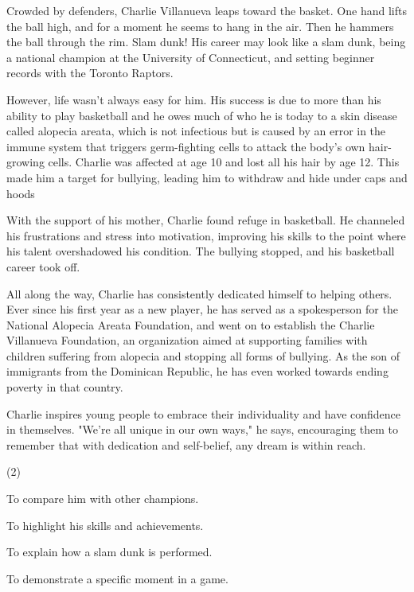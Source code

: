 \documentclass{英语试卷}
\begin{document}
\par Crowded by defenders, Charlie Villanueva leaps toward the basket. One hand lifts the ball high, and for a moment he seems to hang in the air. Then he hammers the ball through the rim. Slam dunk! His career may look like a slam dunk, being a national champion at the University of Connecticut, and setting beginner records with the Toronto Raptors.\par
\par However, life wasn't always easy for him. His success is due to more than his ability to play basketball and he owes much of who he is today to a skin disease called alopecia areata, which is not infectious but is caused by an error in the immune system that triggers germ-fighting cells to attack the body's own hair-growing cells. Charlie was affected at age 10 and lost all his hair by age 12. This made him a target for bullying, leading him to withdraw and hide under caps and hoods\par
\par With the support of his mother, Charlie found refuge in basketball. He channeled his frustrations and stress into motivation, improving his skills to the point where his talent overshadowed his condition. The bullying stopped, and his basketball career took off.\par
\par All along the way, Charlie has consistently dedicated himself to helping others. Ever since his first year as a new player, he has served as a spokesperson for the National Alopecia Areata Foundation, and went on to establish the Charlie Villanueva Foundation, an organization aimed at supporting families with children suffering from alopecia and stopping all forms of bullying. As the son of immigrants from the Dominican Republic, he has even worked towards ending poverty in that country.\par
\par Charlie inspires young people to embrace their individuality and have confidence in themselves. "We're all unique in our own ways," he says, encouraging them to remember that with dedication and self-belief, any dream is within reach.\par
{}
\begin{choices}(2)
  \item To compare him with other champions.
  \item To highlight his skills and achievements.
  \item To explain how a slam dunk is performed.
  \item To demonstrate a specific moment in a game.
\end{choices}
\end{document}

